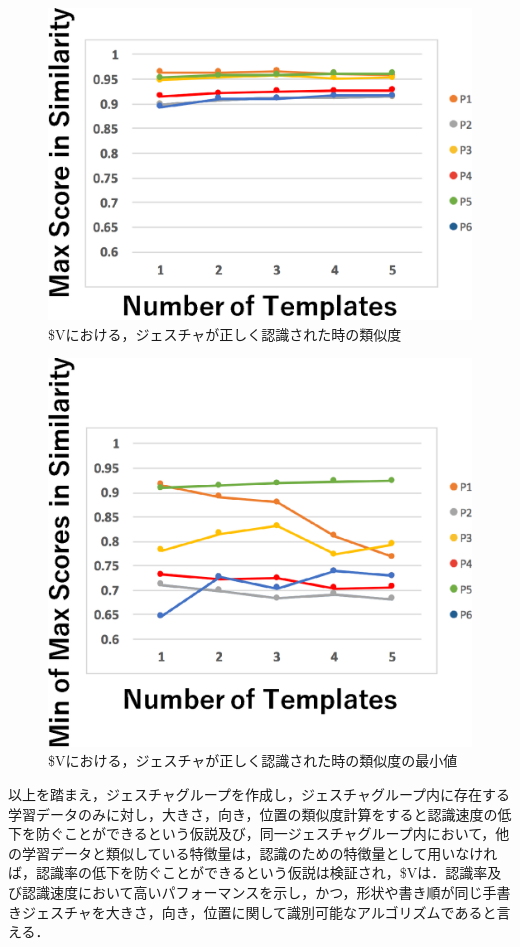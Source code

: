 \begin{figure}[!h]
\centering
\includegraphics[width=0.7\columnwidth]{img/rec_sim.eps}
\caption{\$Vにおける，ジェスチャが正しく認識された時の類似度}
\label{fig:rec_sim}
\end{figure}

\begin{figure}[!h]
\centering
\includegraphics[width=0.7\columnwidth]{img/rec_min.eps}
\caption{\$Vにおける，ジェスチャが正しく認識された時の類似度の最小値}
\label{fig:rec_min}
\end{figure}

\clearpage
以上を踏まえ，ジェスチャグループを作成し，ジェスチャグループ内に存在する学習データのみに対し，大きさ，向き，位置の類似度計算をすると認識速度の低下を防ぐことができるという仮説及び，同一ジェスチャグループ内において，他の学習データと類似している特徴量は，認識のための特徴量として用いなければ，認識率の低下を防ぐことができるという仮説は検証され，\$Vは．認識率及び認識速度において高いパフォーマンスを示し，かつ，形状や書き順が同じ手書きジェスチャを大きさ，向き，位置に関して識別可能なアルゴリズムであると言える．

